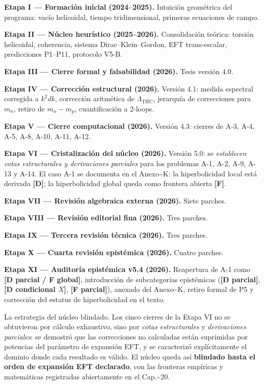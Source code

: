 ﻿\documentclass[11pt,letterpaper]{article}
\begin{document}
\textbf{Etapa I --- Formación inicial (2024--2025).} Intuición geométrica del programa: vacío helicoidal, tiempo tridimensional, primeras ecuaciones de campo.

\textbf{Etapa II --- Núcleo heurístico (2025--2026).} Consolidación teórica: torsión helicoidal, coherencia, sistema Dirac--Klein--Gordon, EFT trans-escalar, predicciones P1--P11, protocolo V5-B.

\textbf{Etapa III --- Cierre formal y falsabilidad (2026).} Tesis versión 4.0.

\textbf{Etapa IV --- Corrección estructural (2026).} Versión 4.1: medida espectral corregida a $k^2 dk$, corrección aritmética de $\Lambda_{\mathrm{THU}}$, jerarquía de correcciones para $m_n$, retiro de $m_n - m_p$, cuantificación a 2-loops.

\textbf{Etapa V --- Cierre computacional (2026).} Versión 4.3: cierres de A-3, A-4, A-5, A-8, A-10, A-11, A-12.

\textbf{Etapa VI --- Cristalización del núcleo (2026).} Versión 5.0: se \emph{establecen cotas estructurales y derivaciones parciales} para los problemas A-1, A-2, A-9, A-13 y A-14. El caso A-1 se documenta en el Anexo\textasciitilde{}K: la hiperbolicidad local está derivada \textbf{[D]}; la hiperbolicidad global queda como frontera abierta \textbf{[F]}.

\textbf{Etapa VII --- Revisión algebraica externa (2026).} Siete parches.

\textbf{Etapa VIII --- Revisión editorial fina (2026).} Tres parches.

\textbf{Etapa IX --- Tercera revisión técnica (2026).} Tres parches.

\textbf{Etapa X --- Cuarta revisión epistémica (2026).} Cuatro parches.

\textbf{Etapa XI --- Auditoría epistémica v5.4 (2026).} Reapertura de A-1 como \textbf{[D parcial / F global]}, introducción de subcategorías epistémicas (\textbf{[D parcial]}, \textbf{[D condicional $X$]}, \textbf{[F parcial]}), anexado del Anexo\textasciitilde{}K, retiro formal de P5 y corrección del estatus de hiperbolicidad en el texto.

La estrategia del núcleo blindado. Los cinco cierres de la Etapa VI no se obtuvieron por cálculo exhaustivo, sino por \emph{cotas estructurales} y \emph{derivaciones parciales}: se demostró que las correcciones no calculadas están suprimidas por potencias del parámetro de expansión EFT, y se caracterizó explícitamente el dominio donde cada resultado es válido. El núcleo queda así \textbf{blindado hasta el orden de expansión EFT declarado}, con las fronteras empíricas y matemáticas registradas abiertamente en el Cap.\textasciitilde{}20.
\end{document}
